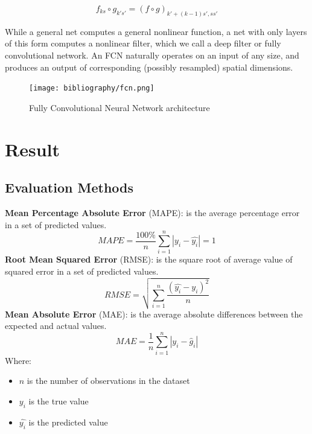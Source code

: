 \documentclass{ieeeojies}
\begin{document}
\[
f_{ks} \circ g_{k's'} = (f \circ g)_{k' + (k-1)s', ss'}
\]

While a general net computes a general nonlinear function,
a net with only layers of this form computes a nonlinear
filter, which we call a deep filter or fully convolutional network.
An FCN naturally operates on an input of any size, and
produces an output of corresponding (possibly resampled)
spatial dimensions.\cite{Ismail}

\begin{figure}[H]
    \centering
\begin{minipage}{0.5\textwidth}
        \centering
        \texttt{[image: bibliography/fcn.png]}
        \caption{Fully Convolutional Neural Network architecture}
        \label{fig:3}
\end{minipage}
\end{figure}

\section{Result}
\subsection{Evaluation Methods}
\textbf{Mean Percentage Absolute Error} (MAPE): is the average percentage error in a set of predicted values\cite{Eval}.\\
\begin{equation*}
    MAPE=\frac{100\%}{n}  \sum_{i=1}^{n} |y_i-\hat{y_i} |  = 1 
\end{equation*}
\textbf{Root Mean Squared Error} (RMSE): is the square root of average value of squared error in a set of predicted values\cite{Eval}.
\begin{equation*}
    RMSE=\sqrt{\sum_{i=1}^{n} \frac{(\hat{y_i}-y_i )^2}{n} }
\end{equation*}
\textbf{Mean Absolute Error} (MAE): is the average absolute differences between the expected and actual values\cite{Eval}.
\begin{equation*}
    MAE= \frac{1}{n}\sum_{i=1}^{n}|y_i - \hat{g}_i|
\end{equation*}
Where:
\begin{itemize}
    \item \(n\) is the number of observations in the dataset
    \item \(y_i\)  is the true value
    \item \(\hat{y_i}\) is the predicted value
\end{itemize}
\end{document}
